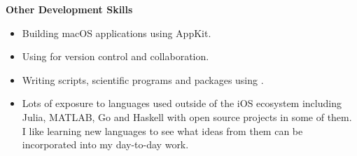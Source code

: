 \textbf{Other Development Skills}
\begin{itemize}[leftmargin=0mm]
\item Building macOS applications using AppKit.
\item Using  for version control and collaboration.
\item Writing scripts, scientific programs and packages using .
\item Lots of exposure to languages used outside of the iOS ecosystem including
  Julia, \mbox{MATLAB}, Go and Haskell with open source projects in some of
  them. I like learning new languages to see what ideas from them can be
  incorporated into my day-to-day work.
\end{itemize}

